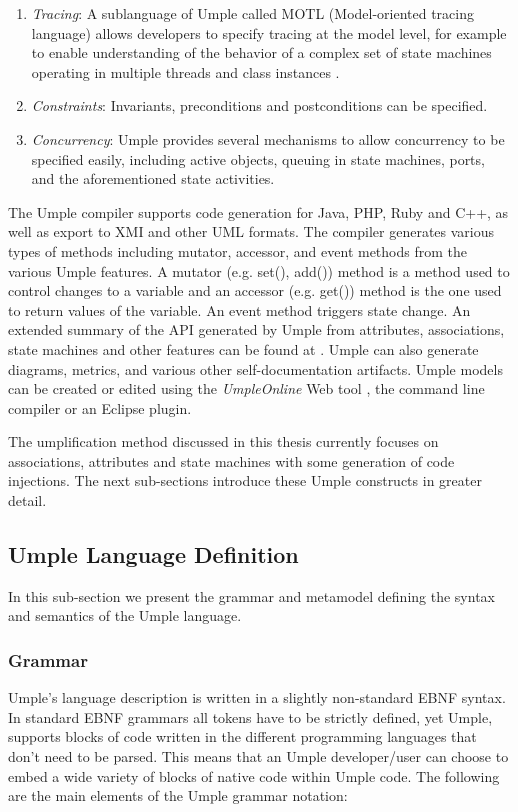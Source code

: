 \begin{enumerate}
 \item 	\textit{Tracing}:  A sublanguage of Umple called MOTL (Model-oriented tracing language) allows developers to specify tracing at the model level, for example to enable understanding of the behavior of a complex set of state machines operating in multiple threads and class instances \cite{UmpleTracing}.
 \item 	\textit{Constraints}: Invariants, preconditions and postconditions can be specified.
 \item 	\textit{Concurrency}: Umple provides several mechanisms to allow concurrency to be specified easily, including active objects, queuing in state machines, ports, and the aforementioned state activities.
\end{enumerate}

The Umple compiler supports code generation for Java, PHP, Ruby and C++, as well as export to XMI and other UML formats. The compiler generates various types of methods including mutator, accessor, and event methods from the various Umple features. A mutator (e.g. set(), add()) method is a method used to control changes to a variable and an accessor (e.g. get()) method is the one used to return values of the variable. An event method triggers state change. An extended summary of the API generated by Umple from attributes, associations, state machines and other features can be found at \cite{UmpleAPI}. Umple can also generate diagrams, metrics, and various other self-documentation artifacts. Umple models can be created or edited using the \textit{UmpleOnline} Web tool \cite{UmpleOnline}, the command line compiler or an Eclipse plugin. 

The umplification method discussed in this thesis currently focuses on associations,  attributes and state machines with some generation of code injections. The next sub-sections introduce these Umple constructs in greater detail.

\subsection{Umple Language Definition}
In this sub-section we present the grammar and metamodel defining the syntax and semantics of the Umple language. 

\subsubsection{Grammar}

Umple's language description is written in a slightly non-standard EBNF syntax. In standard EBNF grammars all tokens have to be strictly defined, yet Umple, supports blocks of code written in the different programming languages that don't need to be parsed. This means that an Umple developer/user can choose to embed a wide variety of blocks of native code within Umple code. The following are the main elements of the Umple grammar notation:

